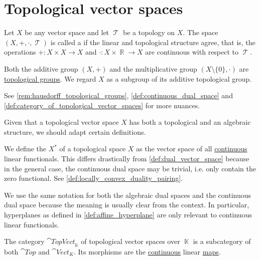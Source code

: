 \section{Topological vector spaces}\label{sec:topological_vector_spaces}

\begin{definition}\label{def:topological_vector_space}
  Let \( X \) be any vector space and let \( \mscrT \) be a topology on \( X \). The space \( (X, +, \cdot, \mscrT) \) is called a  if the linear and topological structure agree, that is, the operations \( +: X \times X \to X \) and \( \cdot: X \times \BbbR \to X \) are continuous with respect to \( \mscrT \).

  Both the additive group \( (X, +) \) and the multiplicative group \( (X \setminus \{ 0 \}, \cdot) \) are \hyperref[def:topological_group]{topological groups}. We regard \( X \) as a subgroup of its additive topological group.

  See \cref{rem:hausdorff_topological_groups}, \cref{def:continuous_dual_space} and \cref{def:category_of_topological_vector_spaces} for more nuances.
\end{definition}

Given that a topological vector space \( X \) has both a topological and an algebraic structure, we should adapt certain definitions.

\begin{definition}\label{def:continuous_dual_space}
  We define the  \( X^* \) of a topological space \( X \) as the vector space of all \hyperref[def:global_continuity]{continuous} linear functionals. This differs drastically from \cref{def:dual_vector_space} because in the general case, the continuous dual space may be trivial, i.e. only contain the zero functional. See \cref{def:locally_convex_duality_pairing}.

  We use the same notation for both the algebraic dual spaces and the continuous dual space because the meaning is usually clear from the context. In particular, hyperplanes as defined in \cref{def:affine_hyperplane} are only relevant to continuous linear functionals.
\end{definition}

\begin{definition}\label{def:category_of_topological_vector_spaces}
  The category \( \cat{TopVect}_{\BbbK} \) of topological vector spaces over \( \BbbK \) is a subcategory of both \( \cat{Top} \) and \( \cat{Vect}_K \). Its morphisms are the \hyperref[def:global_continuity]{continuous} linear \hyperref[def:semimodule/morphism]{maps}.
\end{definition}


